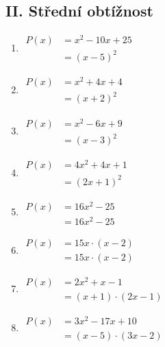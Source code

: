 \documentclass[11pt,a4paper]{article}
\begin{document}
\subsection*{II. Střední obtížnost}
\begin{enumerate}[label={},itemsep=9pt]
\item[\textbf{C007}] \(\displaystyle \begin{aligned}P(x)&=x^{2} - 10x + 25\\ &= \left(x - 5\right)^{2}\end{aligned}\)\par
\item[\textbf{C008}] \(\displaystyle \begin{aligned}P(x)&=x^{2} + 4x + 4\\ &= \left(x + 2\right)^{2}\end{aligned}\)\par
\item[\textbf{C009}] \(\displaystyle \begin{aligned}P(x)&=x^{2} - 6x + 9\\ &= \left(x - 3\right)^{2}\end{aligned}\)\par
\item[\textbf{C010}] \(\displaystyle \begin{aligned}P(x)&=4x^{2} + 4x + 1\\ &= \left(2x + 1\right)^{2}\end{aligned}\)\par
\item[\textbf{C011}] \(\displaystyle \begin{aligned}P(x)&=16x^{2} - 25\\ &= 16x^{2} - 25\end{aligned}\)\par
\item[\textbf{C012}] \(\displaystyle \begin{aligned}P(x)&=15x \cdot \left(x - 2\right)\\ &= 15x \cdot \left(x - 2\right)\end{aligned}\)\par
\item[\textbf{C013}] \(\displaystyle \begin{aligned}P(x)&=2x^{2} + x - 1\\ &= \left(x + 1\right) \cdot \left(2x - 1\right)\end{aligned}\)\par
\item[\textbf{C014}] \(\displaystyle \begin{aligned}P(x)&=3x^{2} - 17x + 10\\ &= \left(x - 5\right) \cdot \left(3x - 2\right)\end{aligned}\)\par

\end{enumerate}
\end{document}
